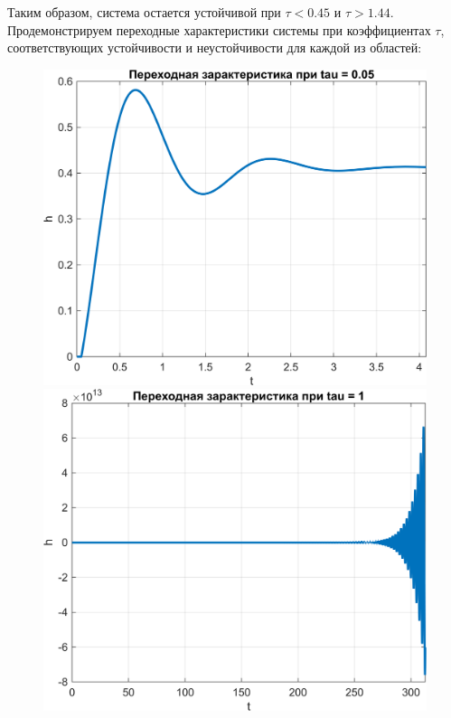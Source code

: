 Таким образом, система остается устойчивой при $\tau < 0.45$ и $\tau > 1.44$. Продемонстрируем переходные 
характеристики системы при коэффициентах $\tau$, соответствующих устойчивости и неустойчивости для каждой из областей:
\begin{figure}[H]
    \centering
    \begin{minipage}{0.45\textwidth}
        \centering
        \includegraphics[width=\textwidth, trim={0cm 0cm 0cm 0cm}]{../images/3_1_5_cl.png}
    \end{minipage}
    \hfill
    \begin{minipage}{0.45\textwidth}
        \centering
        \includegraphics[width=\textwidth, trim={0cm 0cm 0cm 0cm}]{../images/3_1_6_cl.png}

\end{minipage}
\end{figure}
